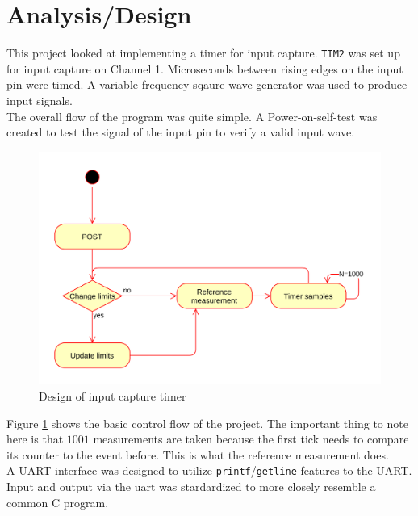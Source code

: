 \documentclass[CMPE]{KGCOEReport}
\def\code#1{\texttt{#1}}
\begin{document}
    \maketitle
    \section*{Analysis/Design}

    This project looked at implementing a timer for input capture. \code{TIM2} was
    set up for input capture on Channel 1. Microseconds between rising edges on the
    input pin were timed. A variable frequency sqaure wave generator was used to produce
    input signals.\\

    The overall flow of the program was quite simple. A Power-on-self-test was created
    to test the signal of the input pin to verify a valid input wave.
    
    \begin{figure}[h!]
      \centering
      \includegraphics[width=\textwidth]{overview}
      \caption{Design of input capture timer}
      \label{fig:overview}
    \end{figure}

    Figure \ref{fig:overview} shows the basic control flow of the project.
    The important thing to note here is that $1001$ measurements are taken
    because the first tick needs to compare its counter to the event before.
    This is what the reference measurement does.\\

    A UART interface was designed to utilize \code{printf}/\code{getline}
    features to the UART. Input and output via the uart was stardardized to
    more closely resemble a common C program. 
\end{document}
